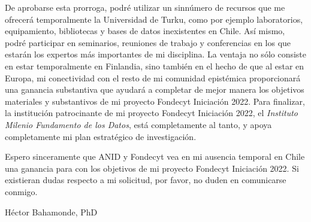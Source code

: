 \documentclass[9pt,stdletter,dateno,sigleft,openany]{newlfm} %
\begin{document}
\begin{newlfm}
De aprobarse esta prorroga, podr\'e utilizar un sinn\'umero de recursos que me ofrecer\'a temporalmente la Universidad de Turku, como por ejemplo laboratorios, equipamiento, bibliotecas y bases de datos inexistentes en Chile. As\'i mismo, podr\'e participar en seminarios, reuniones de trabajo y conferencias en los que estar\'an los expertos m\'as importantes de mi disciplina. La ventaja no s\'olo consiste en estar temporalmente en Finlandia, sino tambi\'en en el hecho de que al estar en Europa, mi conectividad con el resto de mi comunidad epist\'emica proporcionar\'a una ganancia substantiva que ayudar\'a a completar de mejor manera los objetivos materiales y substantivos de mi proyecto Fondecyt Iniciaci\'on 2022. Para finalizar, la instituci\'on patrocinante de mi proyecto Fondecyt Iniciaci\'on 2022, el \emph{Instituto Milenio Fundamento de los Datos}, est\'a completamente al tanto, y apoya completamente mi plan estrat\'egico de investigaci\'on.

Espero sinceramente que ANID y Fondecyt vea en mi ausencia temporal en Chile una ganancia para con los objetivos de mi proyecto Fondecyt Iniciaci\'on 2022. Si existieran dudas respecto a mi solicitud, por favor, no duden en comunicarse conmigo.

{\vspace{0.5cm}\hspace{10cm}H\'ector Bahamonde, PhD}


\end{newlfm}
\end{document}
